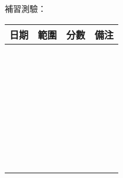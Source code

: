\documentclass{article}
\begin{document}
    \newpage
    \noindent 補習測驗：
    \begin{center}
        \begin{tabular}{|m{2cm}|m{6cm}|m{2cm}|m{5cm}|}
            \hline
            日期&範圍&分數&備注\\
            \hline
            &&&\\ &&&\\
            \hline
            &&&\\ &&&\\
            \hline
            &&&\\ &&&\\
            \hline
            &&&\\ &&&\\
            \hline
            &&&\\ &&&\\
            \hline
            &&&\\ &&&\\
            \hline
            &&&\\ &&&\\
            \hline
            &&&\\ &&&\\
            \hline
            &&&\\ &&&\\
            \hline
            &&&\\ &&&\\
            \hline
            &&&\\ &&&\\
            \hline
            &&&\\ &&&\\
            \hline
            &&&\\ &&&\\
            \hline
            &&&\\ &&&\\
            \hline
            &&&\\ &&&\\
            \hline
            &&&\\ &&&\\
            \hline
            &&&\\ &&&\\
            \hline
            &&&\\ &&&\\
            \hline
        \end{tabular}
    \end{center}
\end{document}
